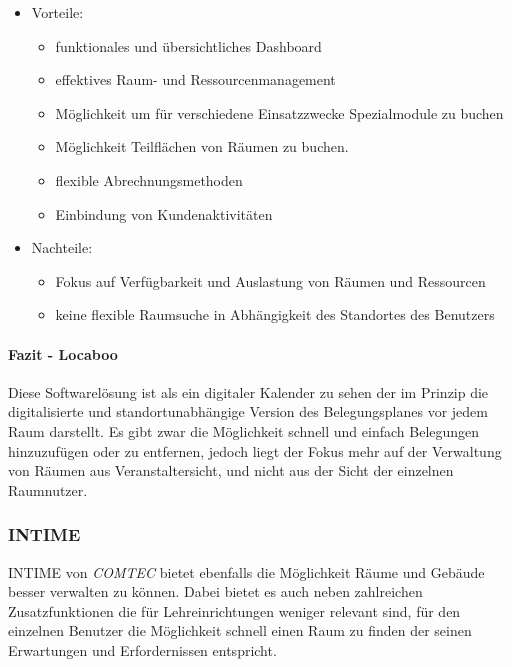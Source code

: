 \begin{itemize}
	\item Vorteile:
		\begin{itemize}
			\item funktionales und übersichtliches Dashboard
			\item effektives Raum- und Ressourcenmanagement
			\item Möglichkeit um für verschiedene Einsatzzwecke Spezialmodule zu buchen
			\item Möglichkeit Teilflächen von \bspw Räumen zu buchen.
			\item flexible Abrechnungsmethoden
			\item Einbindung von Kundenaktivitäten
		\end{itemize}
	\item Nachteile:
		\begin{itemize}
			\item Fokus auf Verfügbarkeit und Auslastung von Räumen und Ressourcen
			\item keine flexible Raumsuche in Abhängigkeit des Standortes des Benutzers
		\end{itemize}
\end{itemize}

\paragraph{Fazit - Locaboo}
\label{sec:Fazit_Locaboo}

Diese Softwarelösung ist als ein digitaler Kalender zu sehen der im Prinzip die
digitalisierte und standortunabhängige Version des Belegungsplanes vor jedem
Raum darstellt. Es gibt zwar die Möglichkeit schnell und einfach Belegungen
hinzuzufügen oder zu entfernen, jedoch liegt der Fokus mehr auf der Verwaltung
von Räumen aus Veranstaltersicht, und nicht aus der Sicht der einzelnen Raumnutzer.  

\subsubsection{INTIME}
\label{sec:INTIME}

INTIME \citep{intime} von \textit{COMTEC} bietet ebenfalls die Möglichkeit
Räume und Gebäude besser verwalten zu können. Dabei bietet es auch neben
zahlreichen Zusatzfunktionen die für Lehreinrichtungen weniger relevant sind,
für den einzelnen Benutzer die Möglichkeit schnell einen Raum zu finden der
seinen Erwartungen und Erfordernissen entspricht.

